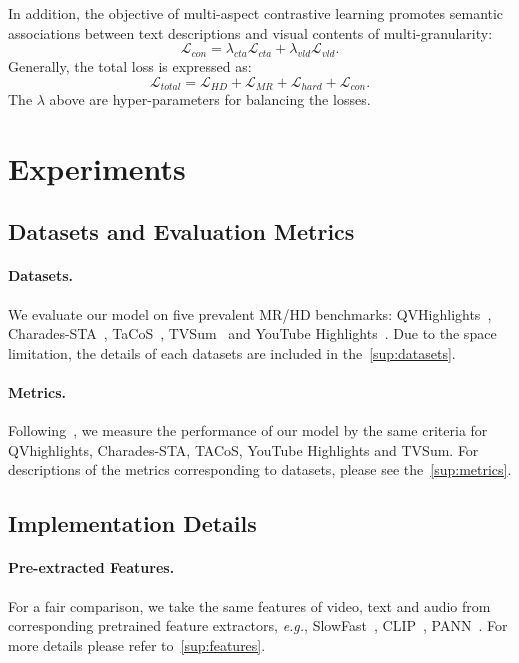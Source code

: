 \documentclass[10pt,twocolumn,letterpaper]{article}
\begin{document}
\noindent In addition, the objective of multi-aspect contrastive learning promotes semantic associations between text descriptions and visual contents of multi-granularity:
\begin{equation}
    \mathcal{L}_{con} = \lambda_{cta}\mathcal{L}_{cta} + \lambda_{vld}\mathcal{L}_{vld}.
\end{equation}
Generally, the total loss is expressed as:
\begin{equation}
    \mathcal{L}_{total} = \mathcal{L}_{HD} + \mathcal{L}_{MR} + \mathcal{L}_{hard} + \mathcal{L}_{con}.
\end{equation}
The $\lambda$ above are hyper-parameters for balancing the losses. \section{Experiments}

\subsection{Datasets and Evaluation Metrics}
\paragraph{Datasets.} We evaluate our model on five prevalent MR/HD benchmarks: QVHighlights~\cite{momentdetr}, Charades-STA~\cite{cha}, TaCoS~\cite{tacos}, TVSum~\cite{tvsum} and YouTube Highlights~\cite{youtubehl}. Due to the space limitation, the details of each datasets are included in the~\cref{sup:datasets}.


\vspace{-7pt}
\paragraph{Metrics.} 
Following~\cite{momentdetr,umt,detr}, we measure the performance of our model by the same criteria for QVhighlights, Charades-STA, TACoS, YouTube Highlights and TVSum. For descriptions of the metrics corresponding to datasets, please see the~\cref{sup:metrics}.


\subsection{Implementation Details}
\paragraph{Pre-extracted Features.} For a fair comparison, we take the same features of video, text and audio from corresponding pretrained feature extractors, \textit{e.g.}, SlowFast~\cite{slowfast}, CLIP~\cite{clip}, PANN~\cite{pann}. For more details please refer to~\cref{sup:features}.
\end{document}
